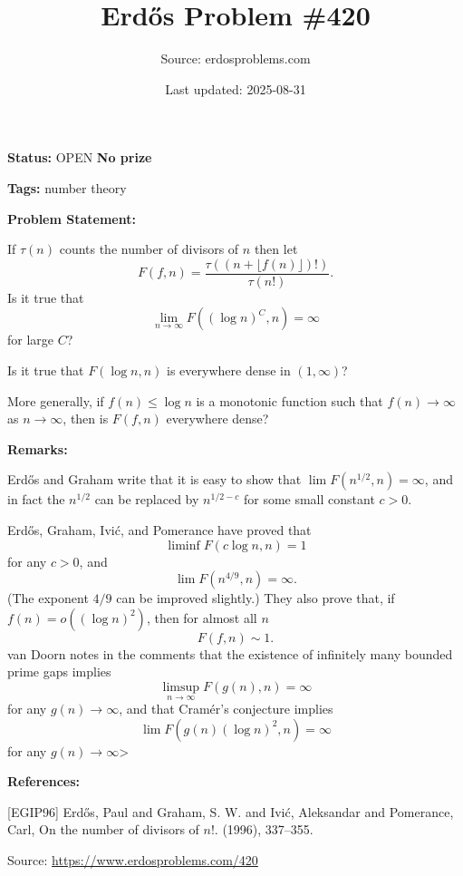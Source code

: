 \documentclass{article}
\title{Erd\H{o}s Problem \#420}
\date{Last updated: 2025-08-31}
\author{Source: erdosproblems.com}
\begin{document}
\maketitle

\noindent\textbf{Status:} OPEN \quad \textbf{No prize}

\noindent\textbf{Tags:} number theory

\medskip
\noindent\textbf{Problem Statement:}

If $\tau(n)$ counts the number of divisors of $n$ then let\[F(f,n)=\frac{\tau((n+\lfloor f(n)\rfloor)!)}{\tau(n!)}.\]Is it true that\[\lim_{n\to \infty}F((\log n)^C,n)=\infty\]for large $C$? 

Is it true that $F(\log n,n)$ is everywhere dense in $(1,\infty)$? 

More generally, if $f(n)\leq \log n$ is a monotonic function such that $f(n)\to \infty$ as $n\to \infty$, then is $F(f,n)$ everywhere dense?

\bigskip
\noindent\textbf{Remarks:}

Erd\H{o}s and Graham write that it is easy to show that $\lim F(n^{1/2},n)=\infty$, and in fact the $n^{1/2}$ can be replaced by $n^{1/2-c}$ for some small constant $c>0$.

Erd\H{o}s, Graham, Ivi\'{c}, and Pomerance \cite{EGIP96} have proved that\[\liminf F(c\log n, n) = 1\]for any $c>0$, and\[\lim F(n^{4/9},n)=\infty.\](The exponent $4/9$ can be improved slightly.) They also prove that, if $f(n)=o((\log n)^2)$, then for almost all $n$\[F(f,n)\sim 1.\]van Doorn notes in the comments that the existence of infinitely many bounded prime gaps implies\[\limsup_{n\to \infty}F(g(n),n)=\infty\]for any $g(n)\to \infty$, and that Cram\'{e}r's conjecture implies\[\lim F(g(n)(\log n)^2, n)=\infty\]for any $g(n)\to \infty$>

\bigskip
\noindent\textbf{References:}

[EGIP96] Erd\H{o}s, Paul and Graham, S. W. and Ivi\'c, Aleksandar and
Pomerance, Carl, On the number of divisors of {$n!$}. (1996), 337--355.

\bigskip
\noindent\small{Source: \url{https://www.erdosproblems.com/420}}
\end{document}
